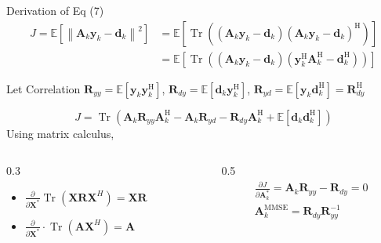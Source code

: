 \documentclass[aspectratio=169, 10pt]{beamer}
\begin{document}
\begin{frame}[label=app-mmse_rx_filter_7]{Derivation of Eq (7)}
    \begin{equation*}
        \begin{aligned}
            J = \mathbb{E}\left[\left\|\mathbf{A}_k \mathbf{y}_k-\mathbf{d}_k\right\|^2\right] & =\mathbb{E}\left[\operatorname{Tr}\left(\left(\mathbf{A}_k \mathbf{y}_k-\mathbf{d}_k\right)\left(\mathbf{A}_k \mathbf{y}_k-\mathbf{d}_k\right)^\mathrm{H}\right)\right]                       \\
                                                                                               & =\mathbb{E}\left[\operatorname{Tr}\left(\left(\mathbf{A}_k \mathbf{y}_k-\mathbf{d}_k\right)\left(\mathbf{y}_k^\mathrm{H} \mathbf{A}_k^\mathrm{H}-\mathbf{d}_k^\mathrm{H}\right)\right)\right]
        \end{aligned}
    \end{equation*}

    Let Correlation $\mathbf{R}_{yy} = \mathbb{E}\left[\mathbf{y}_k \mathbf{y}_k^\mathrm{H}\right]$,
    $\mathbf{R}_{dy} = \mathbb{E}\left[\mathbf{d}_k \mathbf{y}_k^\mathrm{H}\right]$,
    $\mathbf{R}_{yd} = \mathbb{E}\left[\mathbf{y}_k \mathbf{d}_k^\mathrm{H}\right] = \mathbf{R}_{dy}^\mathrm{H}$

    \begin{equation*}
        J =\operatorname{Tr}\left(
        \mathbf{A}_k \mathbf{R}_{yy} \mathbf{A}_k^\mathrm{H}
        -\mathbf{A}_k\mathbf{R}_{yd}
        -\mathbf{R}_{dy}\mathbf{A}_k^\mathrm{H}
        +\mathbb{E}\left[\mathbf{d}_k \mathbf{d}_k^\mathrm{H}\right]
        \right)
    \end{equation*}
    Using matrix calculus,
    \begin{columns}
        \begin{column}{0.3\textwidth}
            \begin{itemize}
                \item $\frac{\partial}{\partial \mathbf{X}^*} \operatorname{Tr}\left(\mathbf{X R} \mathbf{X}^H\right)=\mathbf{X} \mathbf{R}$
                \item $\frac{\partial}{\partial \mathbf{X}^*} \cdot \operatorname{Tr}\left(\mathbf{A} \mathbf{X}^H\right)=\mathbf{A}$
            \end{itemize}
        \end{column}
        \begin{column}{0.5\textwidth}
            \begin{align*}
                \frac{\partial J}{\partial \mathbf{A}_k^\ast} = \mathbf{A}_k\mathbf{R}_{yy}
                - \mathbf{R}_{dy} = 0 \\
                \mathbf{A}_k^\mathrm{MMSE} = \mathbf{R}_{dy}\mathbf{R}_{yy}^{-1}
            \end{align*}
        \end{column}
    \end{columns}
\end{frame}
\end{document}

